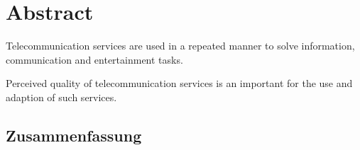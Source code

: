 \begingroup
\let\clearpage\relax
\let\cleardoublepage\relax
\let\cleardoublepage\relax

\chapter*{Abstract}
Telecommunication services are used in a repeated manner to solve information, communication and entertainment tasks.

Perceived quality of telecommunication services is an important for the use and adaption of such services.



\vfill

\begin{otherlanguage}{ngerman}
\chapter*{Zusammenfassung}


\end{otherlanguage}
\endgroup			
\vfill